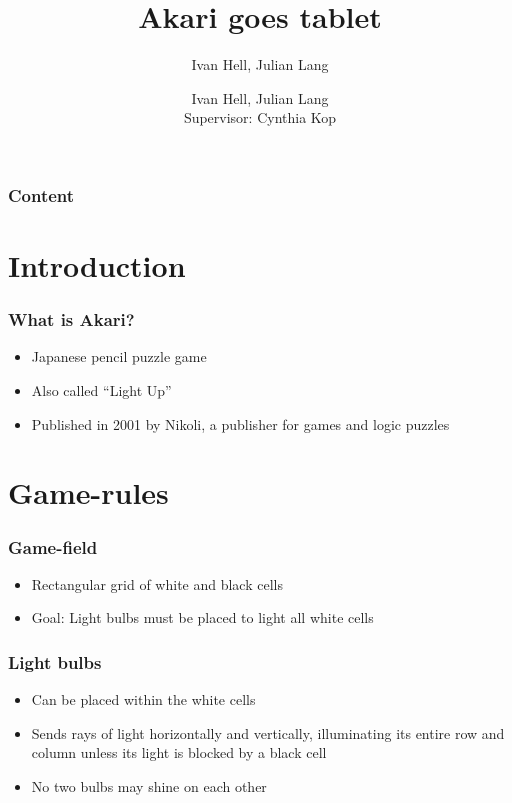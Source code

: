 \documentclass[xcolor=dvipsnames]{beamer}
\begin{document}
\title{Akari goes tablet}
\author{Ivan Hell, Julian Lang}
\author[Ivan Hell, Julian Lang]{Ivan Hell, Julian Lang{\\\vspace*{10mm}\small Supervisor: Cynthia Kop}}

\begin{frame}
\titlepage
\end{frame}

\begin{frame}
  \frametitle{Content}
  \scriptsize 
  \tableofcontents
\end{frame}


\section{Introduction}
\begin{frame}
  \frametitle{What is Akari?}
  \begin{itemize}
  \item Japanese pencil puzzle game
  \item Also called ``Light Up''
  \item Published in 2001 by Nikoli, a publisher for games and logic puzzles
  \end{itemize}
\end{frame}

\section{Game-rules}
\begin{frame}
  \frametitle{Game-field}
  \begin{itemize} 
  \item Rectangular grid of white and black cells
  \item Goal: Light bulbs must be placed to light all white cells
  \end{itemize}
\end{frame}

\begin{frame}
  \frametitle{Light bulbs}
  \begin{itemize}
  \item Can be placed within the white cells
  \item Sends rays of light horizontally and vertically, illuminating its entire row and column unless its light is blocked by a black cell
  \item No two bulbs may shine on each other
  \end{itemize}
\end{frame}
\end{document}
